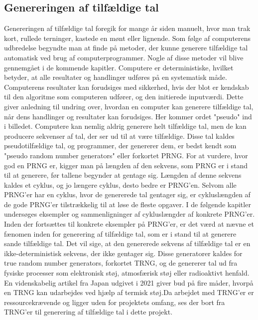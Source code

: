 \subsection{Genereringen af tilfældige tal}
Genereringen af tilfældige tal foregik for mange år siden manuelt, hvor man trak kort, rullede terninger, kastede en mønt eller lignende. Som følge af computerens udbredelse begyndte man at finde på metoder, der kunne generere tilfældige tal automatisk ved brug af computerprogrammer. Nogle af disse metoder vil blive gennemgået i de kommende kapitler.
Computere er deterministiske, hvilket betyder, at alle resultater og handlinger udføres på en systematisk måde. Computerens resultater kan forudsiges med sikkerhed, hvis der blot er kendskab til den algoritme som computeren udfører, og den initierede inputværdi. Dette giver anledning til undring over, hvordan en computer kan generere tilfældige tal, når dens handlinger og resultater kan forudsiges. Her kommer ordet "pseudo" ind i billedet. Computere kan nemlig aldrig generere helt tilfældige tal, men de kan producere sekvenser af tal, der ser ud til at være tilfældige. Disse tal kaldes pseudotilfældige tal, og programmer, der genererer dem, er bedst kendt som "pseudo random number generators" eller forkortet PRNG. For at vurdere, hvor god en PRNG er, kigger man på længden af den sekvens, som PRNG er i stand til at generere, før tallene begynder at gentage sig. Længden af denne sekvens kaldes et cyklus, og jo længere cyklus, desto bedre er PRNG'en. Selvom alle PRNG'er har en cyklus, hvor de genererede tal gentager sig, er cykluslængden af de gode PRNG'er tilstrækkelig til at løse de fleste opgaver. I de følgende kapitler undersøges eksempler og sammenligninger af cykluslængder af konkrete PRNG'er. Inden der fortsættes til konkrete eksempler på PRNG'er, er det værd at nævne et fænomen inden for generering af tilfældige tal, som er i stand til at generere sande tilfældige tal. Det vil sige, at den genererede sekvens af tilfældige tal er en ikke-deterministisk sekvens, der ikke gentager sig. Disse generatorer kaldes for true random number generators, forkortet TRNG, og de genererer tal ud fra fysiske processer som elektronisk støj, atmosfærisk støj eller radioaktivt henfald. En videnskabelig artikel fra Japan udgivet i 2021
\cite{Matsuoka2021} 
giver bud på fire måder, hvorpå en TRNG kan udarbejdes ved hjælp af termisk støj.Da arbejdet med TRNG'er er ressourcekrævende og ligger uden for projektets omfang, ses der bort fra TRNG'er til generering af tilfældige tal i dette projekt.

